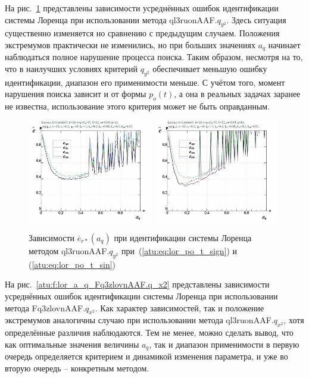 На рис.~\ref{atu:f:lor_a_q_ql3ruonAAF.q_y2} представлены зависимости
усреднённых ошибок идентификации системы Лоренца при использовании метода ql3ruonAAF.$q_{y^2}$.
Здесь ситуация существенно изменяется но сравнению с предыдущим случаем.
Положения экстремумов практически не изменились, но
при больших значениях $a_q$ начинает наблюдаться полное нарушение
процесса поиска. Таким образом, несмотря на то,
что в наилучших условиях критерий $q_{y^2}$ обеспечивает меньшую
ошибку идентификации, диапазон его применимости меньше. С учётом
того, момент нарушения поиска зависит и от формы $p_o(t)$,
а она в реальных задачах заранее не известна, использование этого критерия может
не быть оправданным.

\begin{figure}[ht!]
  \centerline{
    \includegraphics[width=0.49\textwidth]{p/cha/lor/ql3ruonAAF/lor_ql3ruonAAF_qy2-p_a_q_e_sign.png}
    \hfill
    \includegraphics[width=0.49\textwidth]{p/cha/lor/ql3ruonAAF/lor_ql3ruonAAF_qy2-p_a_q_e_sin.png}
  }
  \caption{Зависимости $\overline{e}_{r*}(a_q)$ при идентификации системы Лоренца методом ql3ruonAAF.$q_{y^2}$
   при~(\ref{atu:eq:lor_po_t_sign}) и (\ref{atu:eq:lor_po_t_sin})}
  \label{atu:f:lor_a_q_ql3ruonAAF.q_y2}
\end{figure}


На рис.~\ref{atu:f:lor_a_q_Fq3zlovnAAF.q_x2} представлены зависимости
усреднённых ошибок идентификации системы Лоренца при использовании метода Fq3zlovnAAF.$q_{x^2}$.
Как характер зависимостей, так и положение экстремумов аналогичны
случаю при использовании метода  ql3ruonAAF.$q_{x^2}$,
хотя определённые различия наблюдаются. Тем не менее,
можно сделать вывод, что как оптимальные значения величины $a_q$,
так и диапазон применимости в первую очередь определяется
критерием и динамикой изменения параметра, и уже во вторую очередь --
конкретным методом.


